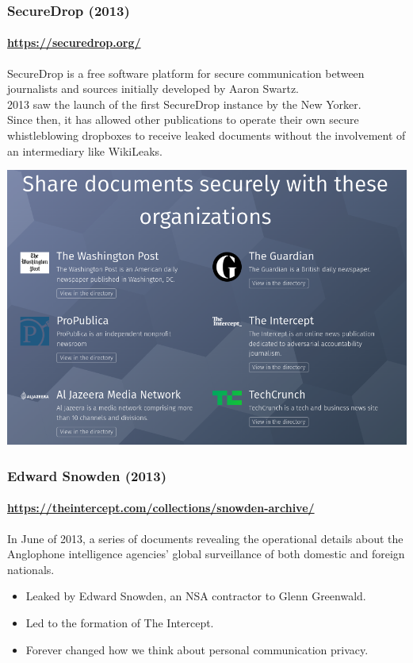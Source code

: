 \documentclass[aspectratio=169,usenames,dvipsnames]{beamer}
\begin{document}
\begin{frame}
  \frametitle{SecureDrop (2013)}
  \framesubtitle{\url{https://securedrop.org/}}

  SecureDrop is a free software platform for secure communication between
  journalists and sources initially developed by Aaron Swartz.\\2013 saw the
  launch of the first SecureDrop instance by the New Yorker.\\Since then, it
  has allowed other publications to operate their own secure whistleblowing
  dropboxes to receive leaked documents without the involvement of an
  intermediary like WikiLeaks.

  \vspace{2mm}

  \centering

  \includegraphics[width=\textwidth,height=0.4\textheight,keepaspectratio]{img/securedrop.png}

\end{frame}

\begin{frame}
  \frametitle{Edward Snowden (2013)}
  \framesubtitle{\url{https://theintercept.com/collections/snowden-archive/}}

  In June of 2013, a series of documents revealing the operational details
  about the Anglophone intelligence agencies' global surveillance of both
  domestic and foreign nationals.

  \pause
  \vspace{5mm}

  \begin{itemize}[<+->]
    \item Leaked by Edward Snowden, an NSA contractor to Glenn Greenwald.
    \item Led to the formation of The Intercept.
    \item Forever changed how we think about personal communication privacy.
  \end{itemize}

\end{frame}
\end{document}
